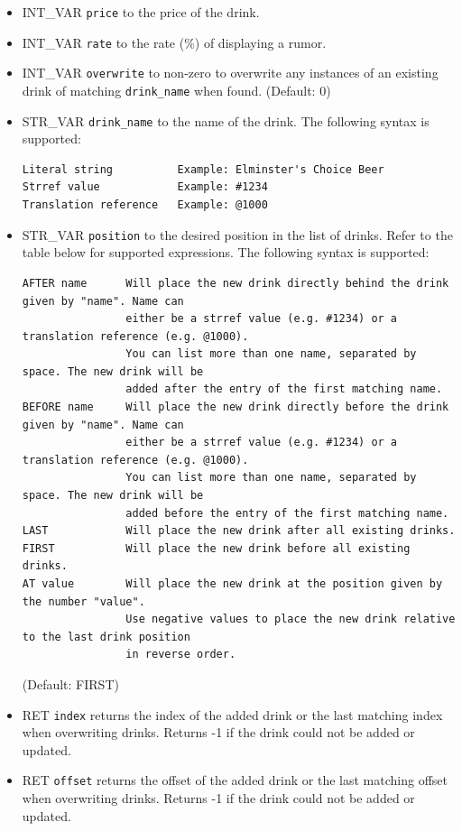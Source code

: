 \documentclass{article}
\begin{document}
\begin{itemize}
\item INT_VAR \verb+price+ to the price of the drink.
\item INT_VAR \verb+rate+ to the rate (\%) of displaying a rumor.
\item INT_VAR \verb+overwrite+ to non-zero to overwrite any instances of an existing drink of matching \verb+drink_name+ when found. (Default: 0)
\item STR_VAR \verb+drink_name+ to the name of the drink.
The following syntax is supported:
\begin{verbatim}
Literal string          Example: Elminster's Choice Beer
Strref value            Example: #1234
Translation reference   Example: @1000
\end{verbatim}
\item STR_VAR \verb+position+ to the desired position in the list of drinks. Refer to the table below for supported expressions. The following syntax is supported:
\begin{verbatim}
AFTER name      Will place the new drink directly behind the drink given by "name". Name can
                either be a strref value (e.g. #1234) or a translation reference (e.g. @1000).
                You can list more than one name, separated by space. The new drink will be
                added after the entry of the first matching name.
BEFORE name     Will place the new drink directly before the drink given by "name". Name can
                either be a strref value (e.g. #1234) or a translation reference (e.g. @1000).
                You can list more than one name, separated by space. The new drink will be
                added before the entry of the first matching name.
LAST            Will place the new drink after all existing drinks.
FIRST           Will place the new drink before all existing drinks.
AT value        Will place the new drink at the position given by the number "value".
                Use negative values to place the new drink relative to the last drink position
                in reverse order.
\end{verbatim}
(Default: FIRST)
\item RET \verb+index+ returns the index of the added drink or the last matching index when overwriting drinks. Returns -1 if the drink could not be added or updated.
\item RET \verb+offset+ returns the offset of the added drink or the last matching offset when overwriting drinks. Returns -1 if the drink could not be added or updated.
\end{itemize}
\end{document}
